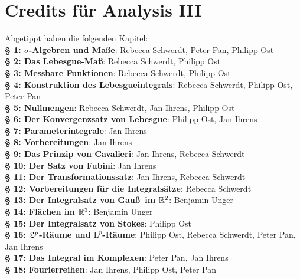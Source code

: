 \documentclass[a4paper,oneside,DIV15,BCOR12mm]{scrbook}
\begin{document}
\renewcommand{\indexname}{Stichwortverzeichnis}
\printindex

\chapter{Credits für Analysis III} Abgetippt haben die folgenden Kapitel:\\%
\textbf{§ 1: $\sigma$-Algebren und Maße}: Rebecca Schwerdt, Peter Pan, Philipp Ost\\
\textbf{§ 2: Das Lebesgue-Maß}: Rebecca Schwerdt, Philipp Ost\\
\textbf{§ 3: Messbare Funktionen}: Rebecca Schwerdt, Philipp Ost\\
\textbf{§ 4: Konstruktion des Lebesgueintegrals}: Rebecca Schwerdt, Philipp Ost, Peter Pan\\
\textbf{§ 5: Nullmengen}: Rebecca Schwerdt, Jan Ihrens, Philipp Ost\\
\textbf{§ 6: Der Konvergenzsatz von Lebesgue}: Philipp Ost, Jan Ihrens \\
\textbf{§ 7: Parameterintegrale}: Jan Ihrens \\
\textbf{§ 8: Vorbereitungen}: Jan Ihrens \\
\textbf{§ 9: Das Prinzip von Cavalieri}: Jan Ihrens, Rebecca Schwerdt\\
\textbf{§ 10: Der Satz von Fubini}: Jan Ihrens\\
\textbf{§ 11: Der Transformationssatz}: Jan Ihrens, Rebecca Schwerdt\\
\textbf{§ 12: Vorbereitungen für die Integralsätze}: Rebecca Schwerdt\\
\textbf{§ 13: Der Integralsatz von Gauß\ im \(\mathbb{R}^{2}\)}: Benjamin Unger\\
\textbf{§ 14: Flächen im \(\mathbb{R}^{3}\)}: Benjamin Unger\\
\textbf{§ 15: Der Integralsatz von Stokes}: Philipp Ost\\
\textbf{§ 16: \(\mathfrak{L}^{p}\)-Räume und \(\mathrm{L}^{p}\)-Räume}: Philipp Ost, Rebecca Schwerdt, Peter Pan, Jan Ihrens \\
\textbf{§ 17: Das Integral im Komplexen}: Peter Pan, Jan Ihrens \\
\textbf{§ 18: Fourierreihen}: Jan Ihrens, Philipp Ost, Peter Pan \\
\end{document}
